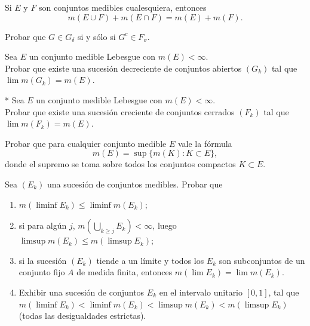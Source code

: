 \documentclass{book}
\newcommand{\di}{\displaystyle}
\begin{document}
	 \begin{ejer}{} 
 Si $E$ y $F$ son conjuntos medibles cualesquiera, entonces
  $$m(E \cup F)+m(E \cap F)=m(E)+m(F).$$
	\end{ejer} 


   \begin{ejer}{}  Probar que $G \in G_{\delta}$ si y sólo si $G^c \in F_{\sigma}$.
	\end{ejer} 
 
%

\begin{ejer}{} 
 Sea $E$ un conjunto medible Lebesgue con $m(E)<\infty$.
\\Probar que existe una sucesi\'on decreciente de conjuntos abiertos $(G_k)$ tal que
$\lim m(G_k)=m (E)$.
\end{ejer} 



\begin{ejer}{}*
 Sea  $E$ un conjunto medible Lebesgue con $m(E)<\infty$.\\
Probar que existe una sucesi\'on creciente de conjuntos cerrados $(F_k)$ tal que
$\lim m(F_k)=m (E)$.
\end{ejer} 

    \begin{ejer}{} 
	Probar que para cualquier conjunto medible $E$ vale la fórmula
   $$m(E)=\sup\{m(K):K\subset E\}, $$
   donde el supremo se toma sobre todos los conjuntos compactos $K \subset E$.
\end{ejer} 

   \begin{ejer}{} 
	Sea $(E_k)$ una sucesión de conjuntos medibles. Probar que
	\begin{enumerate}
    \item $m(\liminf E_k)\leq \liminf m(E_k)$;
    \item si para alg\'un $j$, \;$m\left(\di\bigcup_{k\geq j}E_k\right)<\infty$, luego\; 
    $\limsup m(E_k)\leq m(\limsup E_k)$;
    \item si la sucesión $(E_k)$ tiende a un límite y todos los $E_k$ son subconjuntos
    de un conjunto fijo $A$ de medida finita, entonces \;$m(\lim E_k)=\lim m(E_k)$.
    \item
    Exhibir una sucesión de conjuntos $E_k$ en el intervalo unitario $[0,1]$, tal que 
    $m(\liminf E_k)<\liminf m(E_k)<\limsup m(E_k)<m(\limsup E_k)$  (todas las desigualdades estrictas).
	\end{enumerate}
	\end{ejer} 
\end{document}
